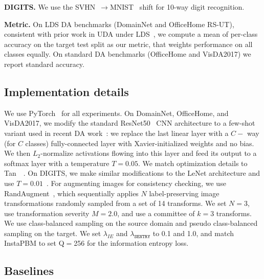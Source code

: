 \documentclass[10pt,twocolumn,letterpaper]{article}
\newcommand{\method}{\texttt{SENTRY}\xspace}
\begin{document}
\par\noindent\textbf{DIGITS.} We use the SVHN~\cite{netzer2011reading}$\rightarrow$MNIST~\cite{lecun1998gradient} shift for 10-way digit recognition.

\par\noindent\textbf{Metric.} On LDS DA benchmarks (DomainNet and OfficeHome RS-UT), consistent with prior work in UDA under LDS~\cite{tan2019generalized,jiang2020implicit}, we compute a mean of per-class accuracy on the target test split as our metric, that weights performance on all classes equally. On standard DA benchmarks (OfficeHome and VisDA2017) we report standard accuracy. 

\vspace{-5pt}
\subsection{Implementation details}
\label{ref:implementation}
\vspace{-5pt}

\noindent We use PyTorch~\cite{paszke2019pytorch} for all experiments. On DomainNet, OfficeHome, and VisDA2017, we modify the standard ResNet50~\cite{he2016deep} CNN architecture to a few-shot variant used in recent DA work~\cite{chen2018closer,saito2019semi,tan2019generalized}: we replace the last linear layer with a $C-$ way (for $C$ classes) fully-connected layer with Xavier-initialized weights and no bias. We then $L_2$-normalize activations flowing into this layer and feed its output to a softmax layer with a temperature $T=0.05$. We match optimization details to Tan~\etal~\cite{tan2019generalized}. On DIGITS, we make similar modifications to the LeNet architecture and use $T=0.01$~\cite{hoffman2017cycada}. For augmenting images for consistency checking, we use RandAugment~\cite{cubuk2020randaugment}, which sequentially applies $N$ label-preserving image transformations randomly sampled from a set of 14 transforms. We set $N=3$, use transformation severity $M=2.0$, and use a committee of $k=3$ transforms. We use class-balanced sampling on the source domain and pseudo class-balanced sampling on the target. We set $\lambda_{IE}$ and $\lambda_{\method}$ to 0.1 and 1.0, and match InstaPBM to set Q$=$256 for the information entropy loss.

\vspace{-5pt}
\subsection{Baselines}
\label{ref:baselines}
\vspace{-5pt}
\end{document}
